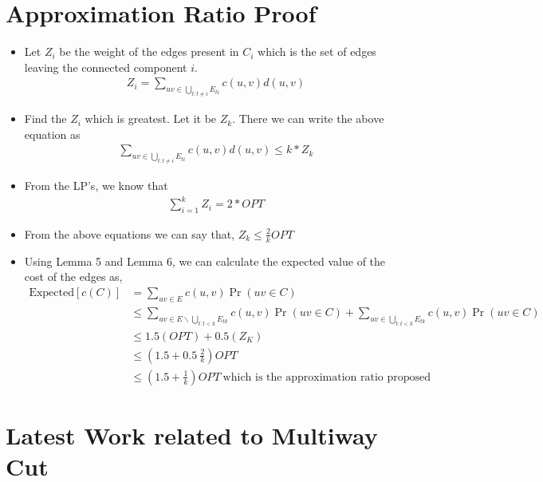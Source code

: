 \documentclass[11pt]{article}
\begin{document}
\section{Approximation Ratio Proof}
\begin{itemize} \itemsep -3pt
    \item Let $Z_i$ be the weight of the edges present in $C_i$ which is the set of edges leaving the connected component $i$. 
        \begin{align*}
            Z_i = \sum\limits_{uv \in \bigcup\limits_{t:t \ne i}{E_{ti}}}{c(u,v)d(u,v)}
        \end{align*}
    \item Find the $Z_i$ which is greatest. Let it be $Z_k$. There we can write the above equation as 
        \begin{align*}
            \sum\limits_{uv \in \bigcup\limits_{t:t \ne i}{E_{ti}}}{c(u,v)d(u,v)} \le k * Z_k
        \end{align*}
    \item From the LP's, we know that
        \begin{align*}
            \sum\limits_{i = 1}^{k}{Z_i} = 2 * OPT
        \end{align*}
    \item From the above equations we can say that, $Z_k \le \frac{2}{k} OPT$ 
    \item Using Lemma 5 and Lemma 6, we can calculate the expected value of the cost of the edges as,
        \begin{align*}
            \text{Expected}[c(C)] &= \sum\limits_{uv \in E}{c(u,v) \Pr(uv \in C)}\\
            &\le \sum\limits_{uv \in E \backslash \bigcup\limits_{t:t<k}{E_{tk}}}{c(u,v) \Pr(uv \in C)} + \sum\limits_{uv \in \bigcup\limits_{t:t<k}{E_{tk}}}{c(u,v) \Pr(uv \in C)} \\
            &\le 1.5 (OPT) + 0.5(Z_K)\\
            &\le (1.5 + 0.5 \ \frac{2}{k})OPT\\
            &\le (1.5 + \frac{1}{k})OPT \ \text{which is the approximation ratio proposed}
        \end{align*}
\end{itemize}


\section{Latest Work related to Multiway Cut}
\end{document}
